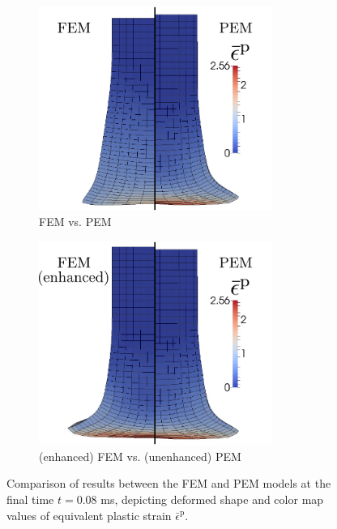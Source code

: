 \begin{figure}[!h]
    \centering
    \begin{subfigure}[b]{0.49\linewidth}
            \centering
            \includegraphics[width=3.0in]{figures/taylor_bar_unmodified_eqps.pdf}
    			\caption{FEM vs. PEM \label{fig:taylor_bar_unmodified_eqps}}
    \end{subfigure}
	\begin{subfigure}[b]{0.49\linewidth}
            \centering
            \includegraphics[width=3.0in]{figures/taylor_bar_fbar_eqps.pdf}
    			\caption{(enhanced) FEM vs. (unenhanced) PEM \label{fig:taylor_bar_fbar_eqps}}
    \end{subfigure}
    \caption{Comparison of results between the FEM and PEM models at the final time $t = 0.08$ ms, depicting deformed shape and color map values of equivalent plastic strain $\bar{\epsilon}^{\mathrm p}$.}
    \label{fig:taylor_bar_eqps}
\end{figure}

